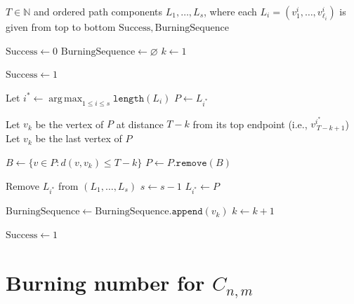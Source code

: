 \documentclass{article}
\DeclareMathOperator*{\argmax}{arg{\,}max}
\begin{document}
\begin{algorithm}[ht]
\caption{\textsc{GreedyPathForest}$(T; L_1,\ldots,L_s)$}
\label{alg:greedy_path_forest}
\begin{algorithmic}[1]
\Require $T \in \mathbb N$ and ordered path components $L_1,\ldots,L_s$,
\Statex \hspace{2em} where each $L_i = (v^i_1,\ldots,v^i_{\ell_i})$ is given from top to bottom
\Ensure $\mathrm{Success}, \mathrm{BurningSequence}$



\State $\mathrm{Success} \gets 0$
\State $\mathrm{BurningSequence} \gets \varnothing$
\State $k \gets 1$


        \State $\mathrm{Success} \gets 1$
        \Return
    \EndIf

    \State Let $\displaystyle i^\ast \gets \argmax_{1 \le i \le s} \texttt{length}(L_i)$ 
    \State $P \gets L_{i^\ast}$
    

    

     
        \State Let $v_k$ be the vertex of $P$ at distance $T-k$ from its top endpoint (i.e., $v^{i^\ast}_{\,T-k+1}$)
    \Else
        \State Let $v_k$ be the last vertex of $P$
    \EndIf

    

    \State $B \gets \{v \in P : d(v,v_k) \le T-k\}$ 
    \State $P \gets P.\texttt{remove}(B)$

        \State Remove $L_{i^\ast}$ from $(L_1,\ldots,L_s)$
        \State $s \gets s-1$
    \Else
        \State $L_{i^\ast} \gets P$
    \EndIf

    \State $\mathrm{BurningSequence} \gets \mathrm{BurningSequence}.\texttt{append}(v_k)$
    \State $k \gets k+1$

\EndWhile

    \State $\mathrm{Success} \gets 1$
\EndIf

\State \Return
\end{algorithmic}
\label{alg: forest}
\end{algorithm}



\section{Burning number for \texorpdfstring{\boldmath$C_{n,m}$}{C_nm}}\label{sec: bnc comb}
\end{document}
